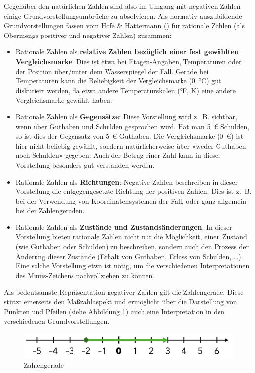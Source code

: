 \documentclass[
]{scrbook}
\providecommand{\tightlist}{%
  \setlength{\itemsep}{0pt}\setlength{\parskip}{0pt}}
\theoremstyle{definition}
\theoremstyle{definition}
\theoremstyle{definition}
\theoremstyle{definition}
\theoremstyle{remark}
\begin{document}
Gegenüber den natürlichen Zahlen sind also im Umgang mit negativen Zahlen einige Grundvorstellungsumbrüche zu absolvieren. Als normativ auszubildende Grundvorstellungen fassen vom Hofe \& Hattermann () für rationale Zahlen (als Obermenge positiver und negativer Zahlen) zusammen:

\begin{itemize}
\tightlist
\item
  Rationale Zahlen als \textbf{relative Zahlen bezüglich einer fest gewählten Vergleichsmarke}: Dies ist etwa bei Etagen-Angaben, Temperaturen oder der Position über/unter dem Wasserspiegel der Fall. Gerade bei Temperaturen kann die Beliebigkeit der Vergleichsmarke (0~°C) gut diskutiert werden, da etwa andere Temperaturskalen (°F, K) eine andere Vergleichsmarke gewählt haben.
\item
  Rationale Zahlen als \textbf{Gegensätze}: Diese Vorstellung wird z.~B. sichtbar, wenn über Guthaben und Schulden gesprochen wird. Hat man 5~€ Schulden, so ist dies der Gegensatz von 5~€ Guthaben. Die Vergleichsmarke (0~€) ist hier nicht beliebig gewählt, sondern natürlicherweise über »weder Guthaben noch Schulden« gegeben. Auch der Betrag einer Zahl kann in dieser Vorstellung besonders gut verstanden werden.
\item
  Rationale Zahlen als \textbf{Richtungen}: Negative Zahlen beschreiben in dieser Vorstellung die entgegengesetzte Richtung der positiven Zahlen. Dies ist z.~B. bei der Verwendung von Koordinatensystemen der Fall, oder ganz allgemein bei der Zahlengeraden.
\item
  Rationale Zahlen als \textbf{Zustände und Zustandsänderungen}: In dieser Vorstellung bieten rationale Zahlen nicht nur die Möglichkeit, einen Zustand (wie Guthaben oder Schulden) zu beschreiben, sondern auch den Prozess der Änderung dieser Zustände (Erhalt von Guthaben, Erlass von Schulden, \ldots). Eine solche Vorstellung etwa ist nötig, um die verschiedenen Interpretationen des Minus-Zeichens nachvollziehen zu können.
\end{itemize}

Als bedeutsamste Repräsentation negativer Zahlen gilt die Zahlengerade. Diese stützt einerseits den Maßzahlaspekt und ermöglicht über die Darstellung von Punkten und Pfeilen (siehe Abbildung \ref{fig:Zahlengerade}) auch eine Interpretation in den verschiedenen Grundvorstellungen.

\begin{figure}

{\centering \includegraphics[width=0.75\linewidth]{pictures/4-Zahlengerade} 

}

\caption{Zahlengerade}\label{fig:Zahlengerade}
\end{figure}
\end{document}
